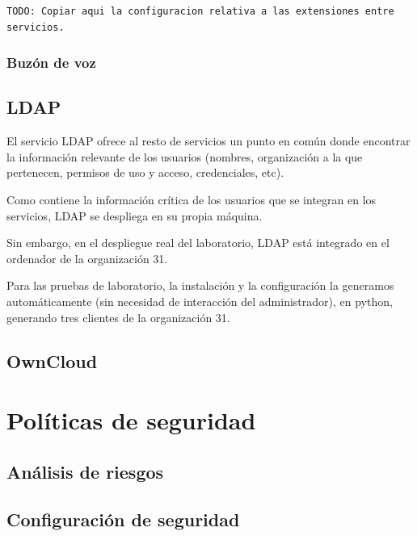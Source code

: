\documentclass[]{article}
\begin{document}
\begin{lstlisting}
TODO: Copiar aqui la configuracion relativa a las extensiones entre servicios.
\end{lstlisting}

\subsubsection{Buzón de voz}

\subsection{LDAP}
El servicio LDAP ofrece al resto de servicios un punto en común donde encontrar la información relevante de los usuarios (nombres, 
organización a la que pertenecen, permisos de uso y acceso, credenciales, etc). 

Como contiene la información crítica de los usuarios que se integran en los servicios, LDAP se despliega en su propia máquina.

Sin embargo, en el despliegue real del laboratorio, LDAP está integrado en el ordenador de la organización 31.

Para las pruebas de laboratorio, la instalación y la configuración la generamos automáticamente (sin necesidad de 
interacción del administrador), en python, generando tres clientes de la organización 31.


\subsection{OwnCloud}

\section{Políticas de seguridad}

\subsection{Análisis de riesgos}

\subsection{Configuración de seguridad}
\end{document}
